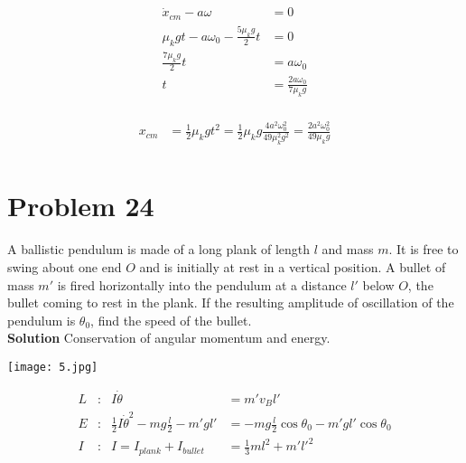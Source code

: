 \documentclass[]{article}
\newcommand{\bd}{\textbf}
\begin{document}
	\begin{equation}
		\begin{split}
			\dot{x}_{cm} - a\omega &= 0 \\
			\mu_k g t - a\omega_0 - \frac{5 \mu_k g}{2} t &= 0 \\
			\frac{7 \mu_k g}{2} t &= a\omega_0 \\
			t &= \frac{2 a \omega_0}{7\mu_k g} \\
		\end{split}
	\end{equation}

	\begin{equation}
		\begin{split}
			x_{cm} &= \frac{1}{2} \mu_k g t^2 = \frac{1}{2} \mu_k g \frac{4 a^2 \omega^2_0}{49\mu^2_k g^2} = \frac{2 a^2 \omega^2_0}{49\mu_k g}\\
		\end{split}
	\end{equation}

	\clearpage

	\section{Problem 24}
	
	A ballistic pendulum is made of a long plank of length $l$ and mass $m$. It is free to swing about one end $O$ and is initially at rest in a vertical position. A bullet of mass $m'$ is fired horizontally into the pendulum at a distance $l'$ below $O$, the bullet coming to rest in the plank. If the resulting amplitude of oscillation of the pendulum is $\theta_0$, find the speed of the bullet. \\
	
	\bd{Solution} Conservation of angular momentum and energy.
	
	\begin{center}
		\texttt{[image: 5.jpg]}
	\end{center}

	\begin{equation}
		\begin{aligned}
			L&: & I \dot{\theta} &= m' v_B l' \\
			E&: & \frac{1}{2} I \dot{\theta}^2 - mg \frac{l}{2} - m'gl' &= - mg \frac{l}{2} \cos \theta_0 - m'g l' \cos \theta_0 \\
			I&: & I = I_{plank} + I_{bullet} &= \frac{1}{3}ml^2 + m' l'^2 \\
		\end{aligned}
	\end{equation}
\end{document}
